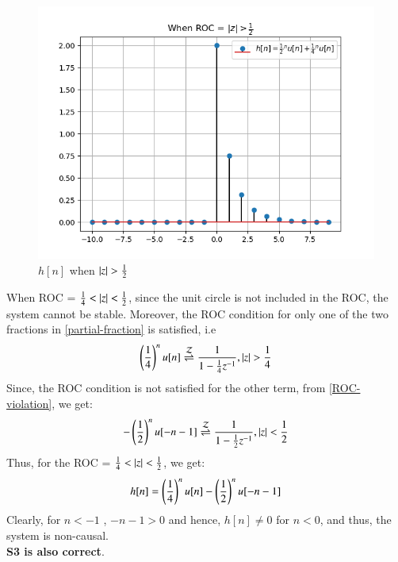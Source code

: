 \documentclass[journal,12pt,twocolumn]{IEEEtran}
\begin{document}
 \begin{figure}[!ht]
\centering
 \includegraphics[width=\columnwidth]{Graphs/S1.png}
 \caption{$h[n]$ when $\left\vert z\right\vert > \frac{1}{2}$}
 \end{figure}
 
 When ROC = $\frac{1}{4} < \left\vert z\right\vert < \frac{1}{2}$, since the unit circle is not included in the ROC, the system cannot be stable. Moreover, the ROC condition for only one of the two fractions in \eqref{partial-fraction} is satisfied, i.e
 \begin{align}
     \left(\frac{1}{4}\right)^nu[n]\overset{\mathcal{Z}}{ \rightleftharpoons} \frac{1}{1 - \frac{1}{4}z^{-1}}  , \left\vert z\right\vert > \frac{1}{4}
 \end{align}
 Since, the ROC condition is not satisfied for the other term, from \eqref{ROC-violation}, we get:
 \begin{align}
    -\left(\frac{1}{2}\right)^nu[-n-1] \overset{\mathcal{Z}}{ \rightleftharpoons} \frac{1}{1 - \frac{1}{2}z^{-1}} , \left\vert z\right\vert < \frac{1}{2}
 \end{align}
 Thus, for the ROC = $\frac{1}{4} < \left\vert z\right\vert < \frac{1}{2}$, we get:
 \begin{align}
     h[n] = \left(\frac{1}{4}\right)^nu[n]  -\left(\frac{1}{2}\right)^{n} u[-n-1] 
 \end{align}
 Clearly, for $n<-1$ , $-n-1 > 0$ and hence, $h[n] \neq 0$ for $n<0$, and thus, the system is non-causal.\\
\textbf{ S3 is also correct}.\\
\end{document}
